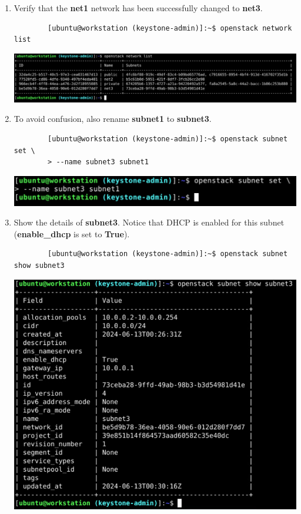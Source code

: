 \documentclass[letterpaper, 12pt]{article}
\begin{document}
\begin{enumerate}
    \item Verify that the \textbf{net1} network has been successfully changed to \textbf{net3}.
    \begin{lstlisting}
        [ubuntu@workstation (keystone-admin)]:~$ openstack network list
    \end{lstlisting}

    \begin{center}
        \includegraphics[width=\linewidth]{images/part3/step18.png}
    \end{center}

    \item To avoid confusion, also rename \textbf{subnet1} to \textbf{subnet3}.
    \begin{lstlisting}
        [ubuntu@workstation (keystone-admin)]:~$ openstack subnet set \
        > --name subnet3 subnet1
    \end{lstlisting}

    \begin{center}
        \includegraphics[width=\linewidth]{images/part3/step19.png}
    \end{center}

    \item Show the details of \textbf{subnet3}. Notice that DHCP is enabled for this subnet (\textbf{enable\_dhcp} is
    set to \textbf{True}).
    \begin{lstlisting}
        [ubuntu@workstation (keystone-admin)]:~$ openstack subnet show subnet3
    \end{lstlisting}

    \begin{center}
        \includegraphics[width=\linewidth]{images/part3/step20.png}
    \end{center}


\end{enumerate}
\end{document}
